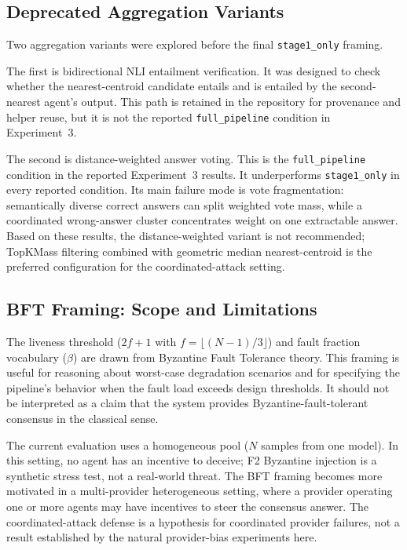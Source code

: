 \documentclass[11pt]{article}
\begin{document}
\subsection{Deprecated Aggregation Variants}
\label{sec:deprecated}

Two aggregation variants were explored before the final \texttt{stage1\_only}
framing.

The first is bidirectional NLI entailment verification. It was designed to check
whether the nearest-centroid candidate entails and is entailed by the
second-nearest agent's output. This path is retained in the repository for
provenance and helper reuse, but it is not the reported \texttt{full\_pipeline}
condition in Experiment~3.

The second is distance-weighted answer voting. This is the \texttt{full\_pipeline}
condition in the reported Experiment~3 results. It underperforms \texttt{stage1\_only}
in every reported condition. Its main failure mode is vote fragmentation:
semantically diverse correct answers can split weighted vote mass, while a
coordinated wrong-answer cluster concentrates weight on one extractable answer.
Based on these results, the distance-weighted variant is not recommended;
TopKMass filtering combined with geometric median nearest-centroid is the
preferred configuration for the coordinated-attack setting.

\subsection{BFT Framing: Scope and Limitations}
\label{sec:bft}

The liveness threshold ($2f+1$ with $f = \lfloor(N-1)/3\rfloor$) and fault
fraction vocabulary ($\beta$) are drawn from Byzantine Fault Tolerance theory.
This framing is useful for reasoning about worst-case degradation scenarios and
for specifying the pipeline's behavior when the fault load exceeds design
thresholds. It should not be interpreted as a claim that the system provides
Byzantine-fault-tolerant consensus in the classical sense.

The current evaluation uses a homogeneous pool ($N$ samples from one model). In
this setting, no agent has an incentive to deceive; F2 Byzantine injection is a
synthetic stress test, not a real-world threat. The BFT framing becomes more
motivated in a multi-provider heterogeneous setting, where a provider operating
one or more agents may have incentives to steer the consensus answer. The
coordinated-attack defense is a hypothesis for coordinated provider failures, not
a result established by the natural provider-bias experiments here.
\end{document}
